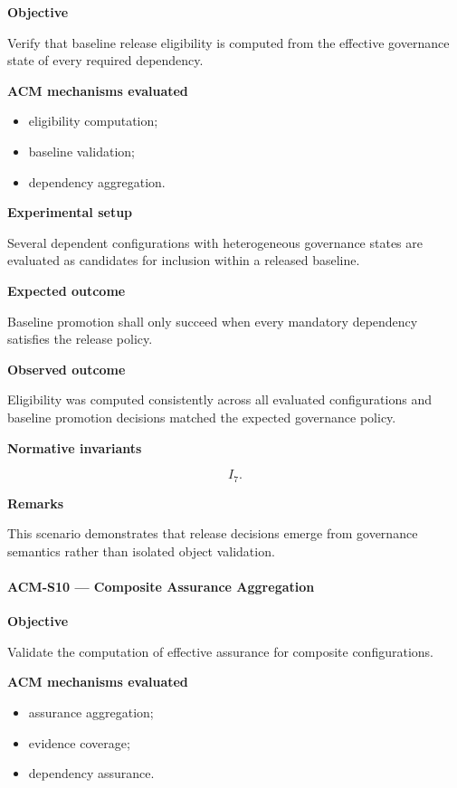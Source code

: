 \documentclass[10pt]{article}
\begin{document}
\textbf{Objective}

Verify that baseline release eligibility is computed from the effective
governance state of every required dependency.

\textbf{ACM mechanisms evaluated}

\begin{itemize}
    \item eligibility computation;
    \item baseline validation;
    \item dependency aggregation.
\end{itemize}

\textbf{Experimental setup}

Several dependent configurations with heterogeneous governance states are
evaluated as candidates for inclusion within a released baseline.

\textbf{Expected outcome}

Baseline promotion shall only succeed when every mandatory dependency satisfies
the release policy.

\textbf{Observed outcome}

Eligibility was computed consistently across all evaluated configurations and
baseline promotion decisions matched the expected governance policy.

\textbf{Normative invariants}

\[
I_7.
\]

\textbf{Remarks}

This scenario demonstrates that release decisions emerge from governance
semantics rather than isolated object validation.

\paragraph{ACM-S10 --- Composite Assurance Aggregation}

\textbf{Objective}

Validate the computation of effective assurance for composite configurations.

\textbf{ACM mechanisms evaluated}

\begin{itemize}
    \item assurance aggregation;
    \item evidence coverage;
    \item dependency assurance.
\end{itemize}
\end{document}
